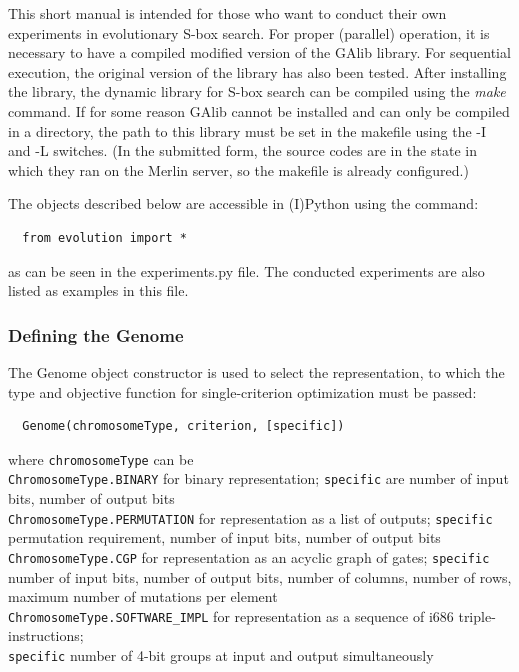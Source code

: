 %
%
%
%
%
%
This short manual is intended for those who want to conduct their own experiments in evolutionary
S-box search.
For proper (parallel) operation, it is necessary to have a compiled modified version of the GAlib library.
For sequential execution, the original version of the library has also been tested.
After installing the library, the dynamic library for S-box search
can be compiled using the \emph{make} command. If for some reason GAlib cannot be installed and can only be compiled
in a directory, the path to this library must be set in the makefile using the -I and -L switches.
(In the submitted form, the source codes are in the state in which they ran on the Merlin server, so the makefile is already configured.)

The objects described below are accessible in (I)Python using the command:
\begin{verbatim}
  from evolution import *
\end{verbatim}
as can be seen in the experiments.py file.
The conducted experiments are also listed as examples in this file.

\subsubsection{Defining the Genome}
The Genome object constructor is used to select the representation, to which the type and
objective function for single-criterion optimization must be passed:
\begin{verbatim}
  Genome(chromosomeType, criterion, [specific])
\end{verbatim}
where \verb|chromosomeType| can be\\
\verb|ChromosomeType.BINARY| for binary representation; \verb|specific| are number of input bits, number of output bits\\
\verb|ChromosomeType.PERMUTATION| for representation as a list of outputs; \verb|specific| permutation requirement, number of input bits,
number of output bits\\
\verb|ChromosomeType.CGP| for representation as an acyclic graph of gates; \verb|specific| number of input bits,
number of output bits, number of columns, number of rows, maximum number of mutations per element\\
\verb|ChromosomeType.SOFTWARE_IMPL| for representation as a sequence of i686 triple-instructions;\\
\verb|specific| number of 4-bit groups at input and output simultaneously\\

